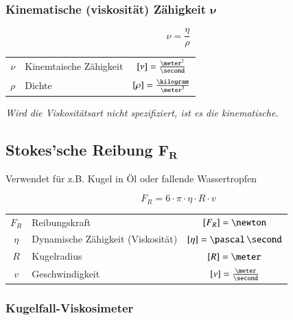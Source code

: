 \subsubsection{Kinematische (viskosität) Zähigkeit $\bm{\nu}$}

\begin{minipage}[c]{0.3\columnwidth}
    \[\boxed{ \nu = \frac{\eta}{\rho} } \]
\end{minipage}
\hfill
\begin{minipage}[c]{0.68\columnwidth}
    \renewcommand{\arraystretch}{1.5}
    \begin{tabular}{c l c}
        $\nu$   & Kinemtaische Zähigkeit    & $[\nu] = \frac{\meter^2}{\second}$    \\
        $\rho$  & Dichte          
                  & $[\rho] = \frac{\kilogram}{\meter^3}$ \\	
    \end{tabular}
    \renewcommand{\arraystretch}{1.5}
\end{minipage}\vspace{1em}

\textit{Wird die Viskositätsart nicht spezifiziert, ist es die kinematische.}

\subsection[Stokes'sche Reibung]{Stokes'sche Reibung $\bm{F_R}$}

Verwendet für z.B. Kugel in Öl oder fallende Wassertropfen

\[\boxed{ F_R = 6 \cdot \pi \cdot \eta \cdot R \cdot v } \]

\begin{tabular}{c l c}
    $F_R$   & Reibungskraft                     & $[F_R] = \newton$                         \\
    $\eta$  & Dynamische Zähigkeit (Viskosität) & $[\eta] = \mathrm{\pascal \, \second}$    \\
    
$R$     & Kugelradius                       & $[R] = \meter$                            \\
    $v$     & Geschwindigkeit                   & $[v] = \frac{\meter}{\second}$		
\end{tabular}


\subsubsection{Kugelfall-Viskosimeter}

